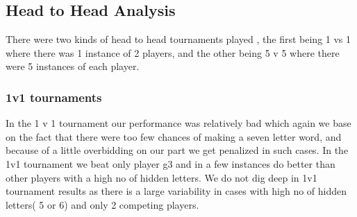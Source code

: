 \documentclass[11pt]{article}
\begin{document}
	\subsection{Head to Head Analysis}
	There were two kinds of head to head tournaments played , the first being 1 vs 1 where there was 1 instance of 2 players, and the other being 5 v 5 where there were 5 instances of each player. 

\subsubsection{1v1 tournaments}	
	In the 1 v 1 tournament our performance was relatively bad which again we base on the fact that there were too few chances of making a seven letter word, and because of a little overbidding on our part we get penalized in such cases. In the 1v1 tournament we beat only player g3 and in a few instances do better than other players with a high no of hidden letters. We do not dig deep in 1v1 tournament results as there is a large variability in cases with high no of hidden letters( 5 or 6) and only 2 competing players. 
\end{document}
